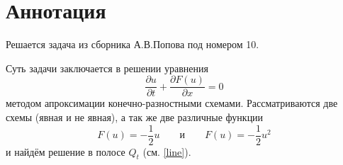 \section{Аннотация}
Решается задача из сборника А.В.Попова под номером 10.

Суть задачи заключается в решении уравнения 
\[
\frac{\partial u}{\partial t} + 
\frac{\partial F(u)}{\partial x} = 0 
\]
методом апроксимации конечно-разностными схемами.
Рассматриваются две схемы (явная и не явная), а так же две различные функции
\[
F(u) = -\frac{1}{2}u \qquad \text{и} \qquad F(u) =-\frac{1}{2}u^2
\]
и найдём решение в полосе $Q_t$ (см. \ref{line}).